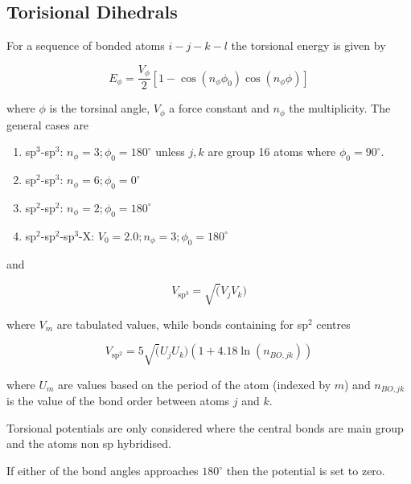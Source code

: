 \documentclass[10pt]{article}
\begin{document}
\clearpage
\subsection{Torisional Dihedrals}

For a sequence of bonded atoms $i-j-k-l$ the torsional energy is given by

\begin{equation}
    E_\phi = \frac{V_\phi}{2} [1 - \cos (n_\phi \phi_0)\cos(n_\phi \phi)]
\end{equation}

where $\phi$ is the torsinal angle, $V_\phi$ a force constant and $n_\phi$ the
multiplicity. The general cases are

\begin{enumerate}
    \item sp$^3$-sp$^3$: $n_\phi = 3; \phi_0 = 180^\circ$ unless $j, k$ are group 16 
        atoms where $\phi_0 = 90^\circ$. 
    
    \item sp$^2$-sp$^3$: $n_\phi = 6; \phi_0 = 0^\circ$ 
    
    \item sp$^2$-sp$^2$: $n_\phi = 2; \phi_0 = 180^\circ$

    \item sp$^2$-sp$^2$-sp$^3$-X: $V_0 = 2.0; n_\phi=3; \phi_0 = 180^\circ$ 
\end{enumerate}

and

\begin{equation}
    V_{\text{sp}^3} = \sqrt(V_j V_k) 
\end{equation}

where $V_m$ are tabulated values, while bonds containing for sp$^{2}$ centres

\begin{equation}
    V_{\text{sp}^2} = 5\sqrt(U_j U_k) (1+4.18\ln(n_{BO, jk})) 
\end{equation}

where $U_m$ are values based on the period of the atom (indexed by $m$) and
$n_{BO, jk}$ is the value of the bond order between atoms $j$ and $k$.

Torsional potentials are only considered where the central bonds are main group and
the atoms non sp hybridised.

If either of the bond angles approaches $180^\circ$ then the potential is set to zero.

\end{document}

